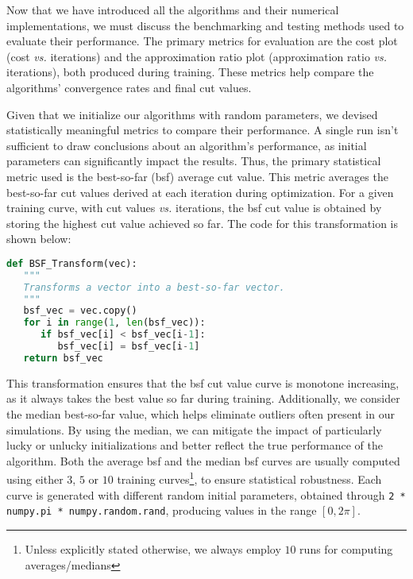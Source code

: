 
Now that we have introduced all the algorithms and their numerical implementations, we must discuss the benchmarking and testing methods used to evaluate their performance. The primary metrics for evaluation are the cost plot (cost \textit{vs.} iterations) and the approximation ratio plot (approximation ratio \textit{vs.} iterations), both produced during training. These metrics help compare the algorithms' convergence rates and final cut values.

Given that we initialize our algorithms with random parameters, we devised statistically meaningful metrics to compare their performance. A single run isn't sufficient to draw conclusions about an algorithm's performance, as initial parameters can significantly impact the results. Thus, the primary statistical metric used is the best-so-far (\acrshort{bsf}) average cut value. This metric averages the best-so-far cut values derived at each iteration during optimization. For a given training curve, with cut values \textit{vs.} iterations, the \acrshort{bsf} cut value is obtained by storing the highest cut value achieved so far. The code for this transformation is shown below:

\begin{lstlisting}[language=Python, style=My_Python, caption={Auxiliary function: Best-so-far transformation}, label={lst:bsf_transform}]
def BSF_Transform(vec):
   """
   Transforms a vector into a best-so-far vector.
   """
   bsf_vec = vec.copy()
   for i in range(1, len(bsf_vec)):
      if bsf_vec[i] < bsf_vec[i-1]:
         bsf_vec[i] = bsf_vec[i-1]
   return bsf_vec
\end{lstlisting}

This transformation ensures that the \acrshort{bsf} cut value curve is monotone increasing, as it always takes the best value so far during training. Additionally, we consider the median best-so-far value, which helps eliminate outliers often present in our simulations. By using the median, we can mitigate the impact of particularly lucky or unlucky initializations and better reflect the true performance of the algorithm. Both the average \acrshort{bsf} and the median \acrshort{bsf} curves are usually computed using either $3$, $5$ or $10$ training curves\footnote{Unless explicitly stated otherwise, we always employ $10$ runs for computing averages/medians}, to ensure statistical robustness. Each curve is generated with different random initial parameters, obtained through \texttt{2 * numpy.pi * numpy.random.rand}, producing values in the range $[0,2\pi]$.

